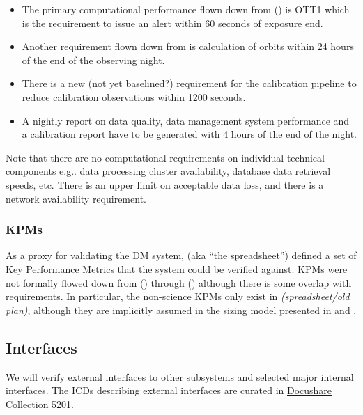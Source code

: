 \begin{itemize}

\item The primary computational performance flown down from  (\LSR) is OTT1 which is the requirement to issue an alert within 60 seconds of exposure end.

\item Another requirement flown down from  is calculation of orbits within 24 hours of the end of the observing night.

\item There is a new (not yet baselined?) requirement for the calibration pipeline to reduce calibration observations within 1200 seconds.

\item A nightly report on data quality, data management system performance and a calibration report have to be generated with 4 hours of the end of the night.

\end{itemize}

Note that there are no computational requirements on individual technical components e.g.. data processing cluster availability, database data retrieval speeds, etc. There is an upper limit on acceptable data loss, and there is a network availability requirement.

\subsubsection{KPMs}

As a proxy for validating the DM system,  (aka “the spreadsheet”) defined a set of Key Performance Metrics that the system could be verified against. KPMs were not formally flowed down from  (\LSR) through  (\OSS) although there is some overlap with  requirements. In particular, the non-science KPMs only exist in  \textit{(spreadsheet/old plan)}, although they are implicitly assumed in the sizing model presented in  and .

\subsection{Interfaces}

We will verify external interfaces to other subsystems and selected major internal interfaces. The ICDs describing external interfaces are curated in \href{https://ls.st/Collection-5201}{Docushare Collection 5201}.
